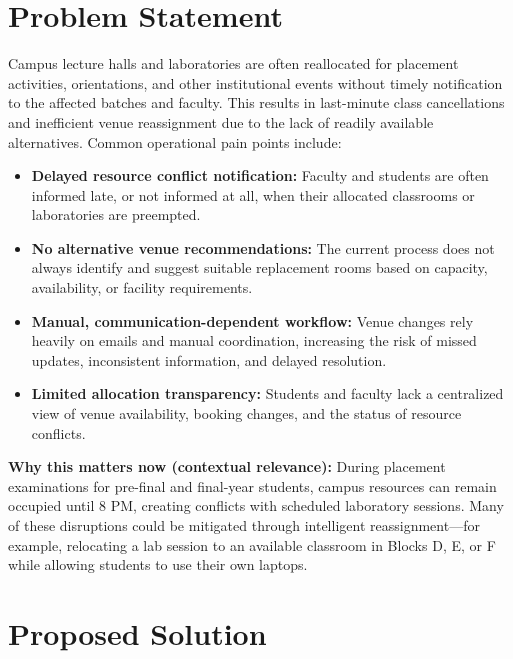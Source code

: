 \documentclass[11pt,a4paper]{article}
\begin{document}
\section{Problem Statement}
Campus lecture halls and laboratories are often reallocated for placement activities, orientations, and other institutional events without timely notification to the affected batches and faculty. This results in last-minute class cancellations and inefficient venue reassignment due to the lack of readily available alternatives. Common operational pain points include:
\begin{itemize}[leftmargin=0.7cm]
    \item \textbf{Delayed resource conflict notification:} Faculty and students are often informed late, or not informed at all, when their allocated classrooms or laboratories are preempted.
    \item \textbf{No alternative venue recommendations:} The current process does not always identify and suggest suitable replacement rooms based on capacity, availability, or facility requirements.
    \item \textbf{Manual, communication-dependent workflow:} Venue changes rely heavily on emails and manual coordination, increasing the risk of missed updates, inconsistent information, and delayed resolution.
    \item \textbf{Limited allocation transparency:} Students and faculty lack a centralized view of venue availability, booking changes, and the status of resource conflicts.
\end{itemize}

\textbf{Why this matters now (contextual relevance):} During placement examinations for pre-final and final-year students, campus resources can remain occupied until 8 PM, creating conflicts with scheduled laboratory sessions. Many of these disruptions could be mitigated through intelligent reassignment—for example, relocating a lab session to an available classroom in Blocks D, E, or F while allowing students to use their own laptops.

\section{Proposed Solution }
\end{document}
